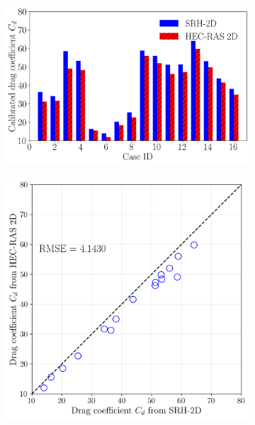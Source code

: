 \documentclass[preview, border=2pt]{standalone}
\begin{document}
\begin{figure}
     \begin{subfigure}[c]{0.45\textwidth}
         \centering
         \caption{}
         \includegraphics[width=\textwidth]{Drag_comparison_SRH_RAS.png}
     \end{subfigure}
     \hfill     
     \begin{subfigure}[c]{0.45\textwidth}
         \centering
         \caption{}
         \includegraphics[width=\textwidth]{Drag_comparison_SRH_RAS_scatter.png}
     \end{subfigure}
\end{figure}
\end{document}
